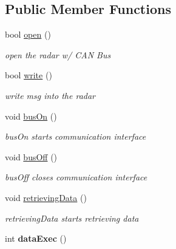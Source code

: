 \subsection*{Public Member Functions}
\begin{DoxyCompactItemize}
\item 
bool \hyperlink{class_radar_controller_a0d77375448b211c62fd7de55f1ddd029}{open} ()
\begin{DoxyCompactList}\small\item\em open the radar w/ C\+A\+N Bus \end{DoxyCompactList}\item 
bool \hyperlink{class_radar_controller_a09975f3f18fd13a533666800a5ff5b24}{write} ()
\begin{DoxyCompactList}\small\item\em write msg into the radar \end{DoxyCompactList}\item 
\hypertarget{class_radar_controller_acff63260ffa92857f1d1e4c44ea3fc4d}{}void \hyperlink{class_radar_controller_acff63260ffa92857f1d1e4c44ea3fc4d}{bus\+On} ()\label{class_radar_controller_acff63260ffa92857f1d1e4c44ea3fc4d}

\begin{DoxyCompactList}\small\item\em bus\+On starts communication interface \end{DoxyCompactList}\item 
\hypertarget{class_radar_controller_aaa344f45e0ca4cae204ff660e1b5d56f}{}void \hyperlink{class_radar_controller_aaa344f45e0ca4cae204ff660e1b5d56f}{bus\+Off} ()\label{class_radar_controller_aaa344f45e0ca4cae204ff660e1b5d56f}

\begin{DoxyCompactList}\small\item\em bus\+Off closes communication interface \end{DoxyCompactList}\item 
\hypertarget{class_radar_controller_aad3c48136e50bb70d2b222c480b1ff63}{}void \hyperlink{class_radar_controller_aad3c48136e50bb70d2b222c480b1ff63}{retrieving\+Data} ()\label{class_radar_controller_aad3c48136e50bb70d2b222c480b1ff63}

\begin{DoxyCompactList}\small\item\em retrieving\+Data starts retrieving data \end{DoxyCompactList}\item 
\hypertarget{class_radar_controller_a022a0e55af4aff4f57c46af3ced689e7}{}int {\bfseries data\+Exec} ()\label{class_radar_controller_a022a0e55af4aff4f57c46af3ced689e7}


\end{DoxyCompactItemize}
